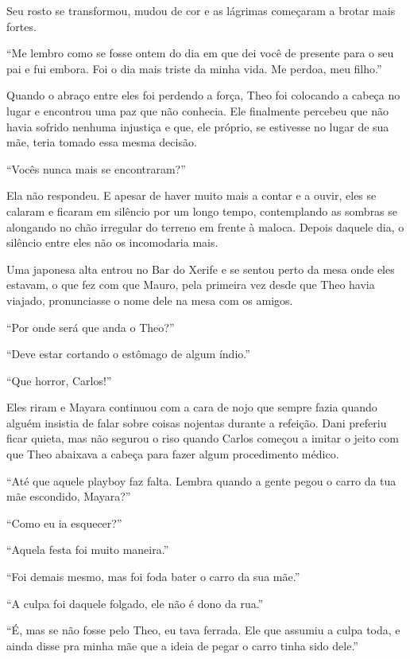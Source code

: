 Seu rosto se transformou, mudou de cor e as lágrimas começaram a brotar
mais fortes.

``Me lembro como se fosse ontem do dia em que dei você de presente para o
seu pai e fui embora. Foi o dia mais triste da minha vida. Me perdoa,
meu filho.''

Quando o abraço entre eles foi perdendo a força, Theo foi colocando a
cabeça no lugar e encontrou uma paz que não conhecia. Ele finalmente
percebeu que não havia sofrido nenhuma injustiça e que, ele próprio, se
estivesse no lugar de sua mãe, teria tomado essa mesma decisão.

``Vocês nunca mais se encontraram?''

Ela não respondeu. E apesar de haver muito mais a contar e a ouvir, eles
se calaram e ficaram em silêncio por um longo tempo, contemplando as
sombras se alongando no chão irregular do terreno em frente à maloca.
Depois daquele dia, o silêncio entre eles não os incomodaria mais.

\asterisc


Uma japonesa alta entrou no Bar do Xerife e se sentou perto da mesa onde
eles estavam, o que fez com que Mauro, pela primeira vez desde que Theo
havia viajado, pronunciasse o nome dele na mesa com os amigos.

``Por onde será que anda o Theo?''

``Deve estar cortando o estômago de algum índio.''

``Que horror, Carlos!''

Eles riram e Mayara continuou com a cara de nojo que sempre fazia quando
alguém insistia de falar sobre coisas nojentas durante a refeição. Dani
preferiu ficar quieta, mas não segurou o riso quando Carlos começou a
imitar o jeito com que Theo abaixava a cabeça para fazer algum procedimento
médico.

``Até que aquele playboy faz falta. Lembra quando a gente pegou o carro
da tua mãe escondido, Mayara?''

``Como eu ia esquecer?''

``Aquela festa foi muito maneira.''

``Foi demais mesmo, mas foi foda bater o carro da sua mãe.''

``A culpa foi daquele folgado, ele não é dono da rua.''

``É, mas se não fosse pelo Theo, eu tava ferrada. Ele que assumiu a culpa
toda, e ainda disse pra minha mãe que a ideia de pegar o carro tinha
sido dele.''

